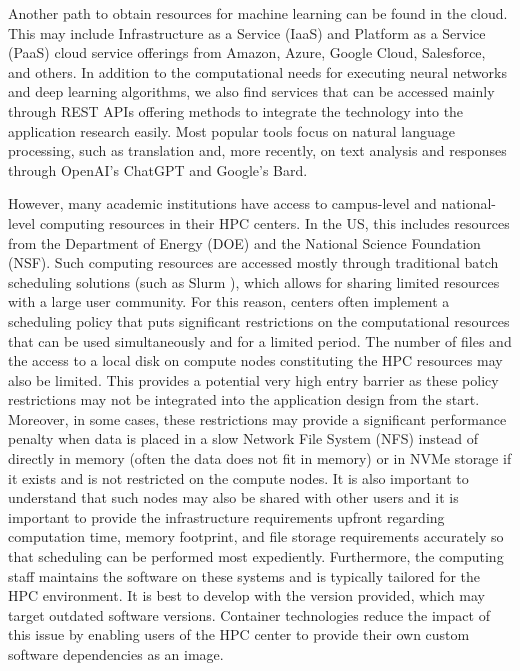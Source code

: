 \documentclass[utf8]{FrontiersinVancouver} %
\begin{document}
Another path to obtain resources for machine learning can be found in the cloud. This may include Infrastructure as a Service (IaaS) and Platform as a Service (PaaS) cloud service offerings from Amazon, Azure, Google Cloud, Salesforce, and others. In addition to the computational needs for executing neural networks and deep learning algorithms, we also find services that can be accessed mainly through REST APIs offering methods to integrate the technology into the application research easily. Most popular tools focus on natural language processing, such as translation and, more recently, on text analysis and responses through OpenAI's ChatGPT and Google's Bard.

However, many academic institutions have access to campus-level and national-level computing resources in their HPC centers. In the US, this includes resources from the Department of Energy (DOE) and the National Science Foundation (NSF). Such computing resources are accessed mostly through traditional batch scheduling solutions (such as Slurm \citep{www-slurm}), which allows for sharing limited resources with a large user community. For this reason, centers often implement a scheduling policy that puts significant restrictions on the computational resources that can be used simultaneously and for a limited period. The number of files and the access to a local disk on compute nodes constituting the HPC resources may also be limited. This provides a potential very high entry barrier as these policy restrictions may not be integrated into the application design from the start. Moreover, in some cases, these restrictions may provide a significant performance penalty when data is placed in a slow Network File System (NFS) instead of directly in memory (often the data does not fit in memory) or in NVMe storage if it exists and is not restricted on the compute nodes.  It is also important to understand that such nodes may also be shared with other users and it is important to provide the infrastructure requirements upfront regarding computation time, memory footprint, and file storage requirements accurately so that scheduling can be performed most expediently.  Furthermore, the computing staff maintains the software on these systems and is typically tailored for the HPC environment.  It is best to develop with the version provided, which may target outdated software versions.  Container technologies reduce the impact of this issue by enabling users of the HPC center to provide their own custom software dependencies as an image.
\end{document}
